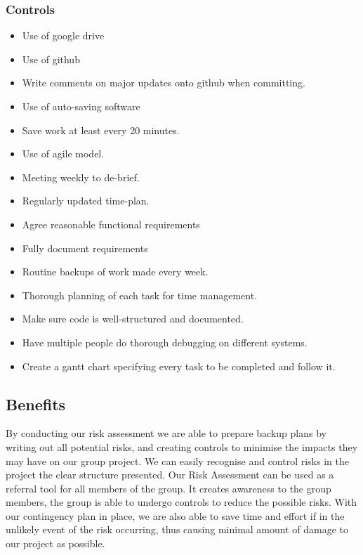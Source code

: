 \documentclass[12pt]{article}
\begin{document}
			\subsubsection{Controls}
				\begin{itemize}
					\item Use of google drive
					\item Use of github
					\item Write comments on major updates onto github when committing.
					\item Use of auto-saving software
					\item Save work at least every 20 minutes.
					\item Use of agile model.
					\item Meeting weekly to de-brief.
					\item Regularly updated time-plan.
					\item Agree reasonable functional requirements
					\item Fully document requirements
					\item Routine backups of work made every week.
					\item Thorough planning of each task for time management.
					\item Make sure code is well-structured and documented.
					\item Have multiple people do thorough debugging on different systems.
					\item Create a gantt chart specifying every task to be completed and follow it. 
				\end{itemize}

		\subsection{Benefits}

			By conducting our risk assessment we are able to prepare backup plans by writing out all potential risks, and creating controls to minimise the impacts they may have on our group project. We can easily recognise and control risks in the project the clear structure presented. Our Risk Assessment can be used as a referral tool for all members of the group. It creates awareness to the group members, the group is able to undergo controls to reduce the possible risks. With our contingency plan in place, we are also able to save time and effort if in the unlikely event of the risk occurring, thus causing minimal amount of damage to our project as possible. 
\end{document}
